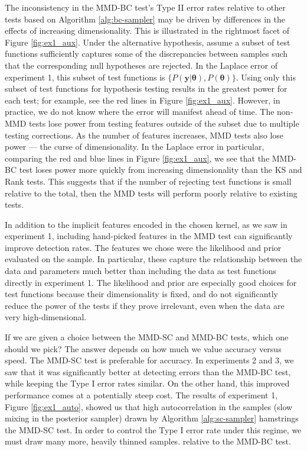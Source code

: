\documentclass[a4paper,11pt]{article}
\begin{document}
The inconsistency in the MMD-BC test's Type II error rates relative to other tests based on Algorithm \ref{alg:bc-sampler} may be driven by differences in the effects of increasing dimensionality. This is illustrated in the rightmost facet of Figure \ref{fig:ex1_aux}. Under the alternative hypothesis, assume a subset of test functions sufficiently captures some of the discrepancies between samples such that the corresponding null hypotheses are rejected. In the Laplace error of experiment 1, this subset of test functions is $\{P(\mathbf{y}|\mathbf{\theta}), P(\mathbf{\theta})\}$. Using only this subset of test functions for hypothesis testing results in the greatest power for each test; for example, see the red lines in Figure \ref{fig:ex1_aux}. However, in practice, we do not know where the error will manifest ahead of time. The non-MMD tests lose power from testing features outside of the subset due to multiple testing corrections. As the number of features increases, MMD tests also lose power \cite{reddi_decreasing_2014} --- the curse of dimensionality. In the Laplace error in particular, comparing the red and blue lines in Figure \ref{fig:ex1_aux}, we see that the MMD-BC test loses power more quickly from increasing dimensionality than the KS and Rank tests. This suggests that if the number of rejecting test functions is small relative to the total, then the MMD tests will perform poorly relative to existing tests. 

In addition to the implicit features encoded in the chosen kernel, as we saw in experiment 1, including hand-picked features in the MMD test can significantly improve detection rates. The features we chose were the likelihood and prior evaluated on the sample. In particular, these capture the relationship between the data and parameters much better than including the data as test functions directly in experiment 1. The likelihood and prior are especially good choices for test functions because their dimensionality is fixed, and do not significantly reduce the power of the tests if they prove irrelevant, even when the data are very high-dimensional.

If we are given a choice between the MMD-SC and MMD-BC tests, which one should we pick? The answer depends on how much we value accuracy versus speed. The MMD-SC test is preferable for accuracy. In experiments 2 and 3, we saw that it was significantly better at detecting errors than the MMD-BC test, while keeping the Type I error rates similar. On the other hand, this improved performance comes at a potentially steep cost. The results of experiment 1, Figure \ref{fig:ex1_auto}, showed us that high autocorrelation in the samples (slow mixing in the posterior sampler) drawn by Algorithm \ref{alg:sc-sampler} hamstrings the MMD-SC test. In order to control the Type I error rate under this regime, we must draw many more, heavily thinned samples. relative to the MMD-BC test. 
\end{document}
